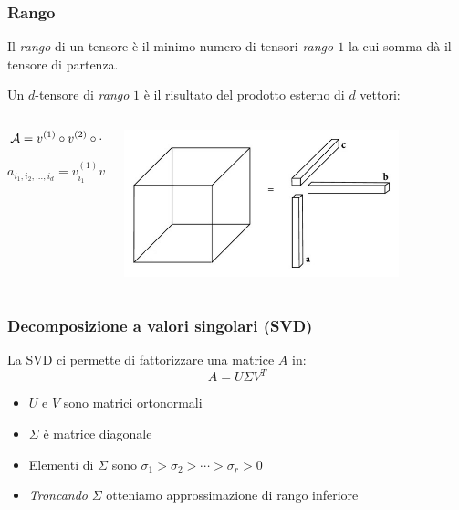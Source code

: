 \documentclass[compress]{beamer}
\theoremstyle{definition}
\theoremstyle{plain}
\begin{document}
\begin{frame}
\frametitle{Rango}
Il \emph{rango} di un tensore è il minimo numero di tensori \emph{rango-$1$} la cui somma dà il tensore di partenza.

\pause
\vspace{5mm}
Un $d$-tensore di \emph{rango} $1$ è il risultato del prodotto esterno di $d$ vettori:

\begin{columns}
\begin{column}{0.5\textwidth}
\begin{equation*}
  \mathcal{A} = v^{(1)} \circ v^{(2)} \circ \cdots \circ v^{(d)}
\end{equation*}

\begin{equation*}
  a_{i_1,i_2,\ldots,i_d} = v_{i_1}^{(1)} v_{i_2}^{(2)} \cdots v_{i_d}^{(d)}
\end{equation*}
\end{column}

\begin{column}{0.5\textwidth}
\begin{center}
	\includegraphics[width=0.8\textwidth]{Img/rank_one_tensor.jpg}
\end{center}
\end{column}
\end{columns}
\end{frame}

\begin{frame}
\frametitle{Decomposizione a valori singolari (SVD)}
La SVD ci permette di fattorizzare una matrice $A$ in:
\begin{equation*}
	A = U \Sigma V^T
\end{equation*}
\begin{itemize}
	\item $U$ e $V$ sono matrici ortonormali
	\item $\Sigma$ è matrice diagonale	
	\item Elementi di $\Sigma$ sono $\sigma_1 > \sigma_2 > \cdots > \sigma_r > 0$
	\item \emph{Troncando} $\Sigma$ otteniamo approssimazione di rango inferiore
\end{itemize}
\end{frame}
\end{document}
